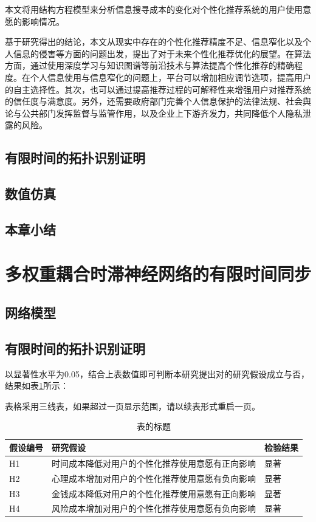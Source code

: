\documentclass[a4paper,zihao=-4,UTF8]{ctexart}
\numberwithin{equation}{section}
\newcommand{\bold}[2][0.3]{\setBold[#1]#2\unsetBold}
\begin{document}
	本文将用结构方程模型来分析信息搜寻成本的变化对个性化推荐系统的用户使用意愿的影响情况。
	
	基于研究得出的结论，本文从现实中存在的个性化推荐精度不足、信息窄化以及个人信息的侵害等方面的问题出发，提出了对于未来个性化推荐优化的展望。在算法方面，通过使用深度学习与知识图谱等前沿技术与算法提高个性化推荐的精确程度。在个人信息使用与信息窄化的问题上，平台可以增加相应调节选项，提高用户的自主选择性。其次，也可以通过提高推荐过程的可解释性来增强用户对推荐系统的信任度与满意度。另外，还需要政府部门完善个人信息保护的法律法规、社会舆论与公共部门发挥监督与监管作用，以及企业上下游齐发力，共同降低个人隐私泄露的风险。
	\subsection{有限时间的拓扑识别证明}
	\subsection{数值仿真}
	\subsection{本章小结}

\newpage
\section{多权重耦合时滞神经网络的有限时间同步}
	\subsection{网络模型}
	\subsection{有限时间的拓扑识别证明}
	以显著性水平为0.05，结合上表数值即可判断本研究提出对的研究假设成立与否，结果如表\ref{tab:4-1}所示：
	
	表格采用三线表，如果超过一页显示范围，请以续表形式重启一页。
	\begin{table}[h]
		\centering
		\caption{表的标题}
		\label{tab:4-1}
		\begin{tabular}{@{}lll@{}}
			\toprule
			\bold{假设编号} & \textbf{研究假设}            & \bold{检验结果} \\ \midrule
			H1            & 时间成本降低对用户的个性化推荐使用意愿有正向影响 & 显著            \\
			H2            & 心理成本增加对用户的个性化推荐使用意愿有负向影响 & 显著            \\
			H3            & 金钱成本降低对用户的个性化推荐使用意愿有正向影响 & 显著            \\
			H4            & 风险成本增加对用户的个性化推荐使用意愿有负向影响 & 显著            \\ \bottomrule
		\end{tabular}
	\end{table}
\end{document}
